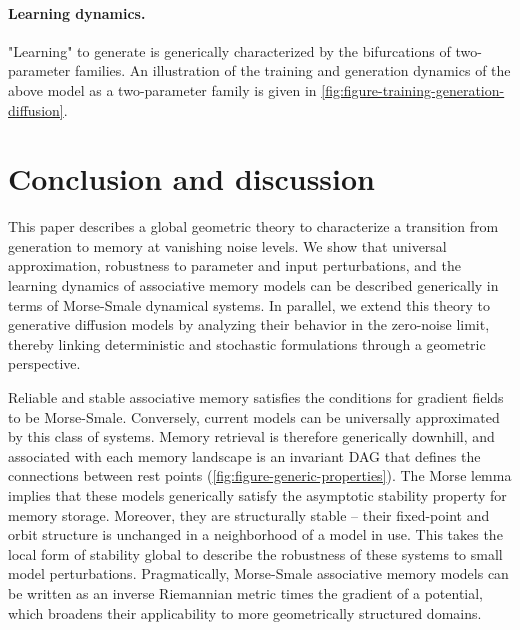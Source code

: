 \documentclass[12pt]{article}
\newcommand\colorAutoref[1]{{\hypersetup{linkcolor=blue}\autoref{#1}}}  %
\begin{document}
\paragraph{Learning dynamics.}
"Learning" to generate is generically characterized by the bifurcations of two-parameter families. An illustration of the training and generation dynamics of the above model as a two-parameter family is given in \colorAutoref{fig:figure-training-generation-diffusion}.



\section{Conclusion and discussion}
\label{section:discussion-and-conclusion}
This paper describes a global geometric theory to characterize a transition from generation to memory at vanishing noise levels. We show that universal approximation, robustness to parameter and input perturbations, and the learning dynamics of associative memory models can be described generically in terms of Morse-Smale dynamical systems. In parallel, we extend this theory to generative diffusion models by analyzing their behavior in the zero-noise limit, thereby linking deterministic and stochastic formulations through a geometric perspective.

Reliable and stable associative memory satisfies the conditions for gradient fields to be Morse-Smale. Conversely, current models can be universally approximated by this class of systems. Memory retrieval is therefore generically downhill, and associated with each memory landscape is an invariant DAG that defines the connections between rest points (\colorAutoref{fig:figure-generic-properties}). The Morse lemma implies that these models generically satisfy the asymptotic stability property for memory storage. Moreover, they are structurally stable -- their fixed-point and orbit structure is unchanged in a neighborhood of a model in use. This takes the local form of stability global to describe the robustness of these systems to small model perturbations. Pragmatically, Morse-Smale associative memory models can be written as an inverse Riemannian metric times the gradient of a potential, which broadens their applicability to more geometrically structured domains. 
\end{document}
